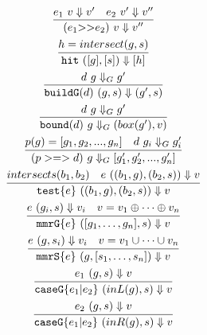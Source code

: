 \documentclass{article}
\newcommand {\chain}{\mathtt{>>}}
\newcommand {\test}{\mathtt{test}}
\newcommand {\isect}{\mathtt{hit}}
\newcommand {\buildG}{\mathtt{buildG}}
\newcommand {\mmrG}{\mathtt{mmrG}}
\newcommand {\caseG}{\mathtt{caseG}}
\newcommand {\mmrS}{\mathtt{mmrS}}
\newcommand {\bound}{\mathtt{bound}}
\begin{document}
\begin{gather}
\infer {(e_1 \chain e_2)~v \Downarrow v''}{e_1~ v \Downarrow v' & e_2~ v' \Downarrow v''} \\
\infer { \isect ~([g],[s]) \Downarrow [h]}{h = intersect(g,s)} \\
\infer { \buildG (d)~(g,s) \Downarrow (g',s)}{d~g \Downarrow_G g'} \\
\infer { \bound (d)~g \Downarrow_G (box(g'),v)}{d~g \Downarrow_G g'} \\
\infer { (p >=> d)~g \Downarrow_G [g_1', g_2',...,g_n']}{p(g) =[g_1, g_2,...,g_n] & d~g_i \Downarrow_G g_i'} \\
\infer { \test \{ e \}~((b_1,g),(b_2,s)) \Downarrow v}{intersects(b_1,b_2) & e~((b_1,g),(b_2,s)) \Downarrow v} \\
\infer { \mmrG \{ e \}~([g_1,\ldots,g_n],s) \Downarrow v}{e~(g_i,s) \Downarrow v_i & v = v_1 \oplus \cdots \oplus v_n}\\
\infer { \mmrS \{ e \}~(g,[s_1,\ldots,s_n]) \Downarrow v}{e~(g,s_i) \Downarrow v_i & v = v_1 \cup \cdots \cup v_n}\\
\infer { \caseG \{ e_1 | e_2 \}~(inL(g),s) \Downarrow v}{e_1~(g,s) \Downarrow v}\\
\infer { \caseG \{ e_1 | e_2 \}~(inR(g),s) \Downarrow v}{e_2~(g,s) \Downarrow v}
\end{gather}
\end{document}
